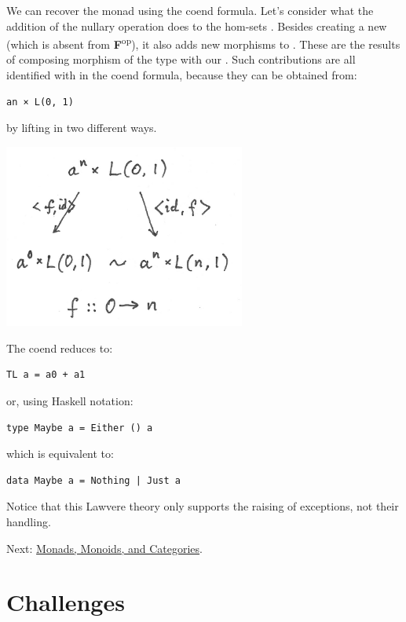 We can recover the  monad using the coend formula. Let's
consider what the addition of the nullary operation does to the hom-sets
. Besides creating a new  (which is
absent from \textbf{F}\textsuperscript{op}), it also adds new morphisms
to . These are the results of composing morphism of the
type  with our .
Such contributions are all identified with  in
the coend formula, because they can be obtained from:

\begin{verbatim}
an × L(0, 1)
\end{verbatim}

by lifting  in two different ways.

\includegraphics[width=3.12500in]{images/equalize2.png}

The coend reduces to:

\begin{verbatim}
TL a = a0 + a1
\end{verbatim}

or, using Haskell notation:

\begin{verbatim}
type Maybe a = Either () a
\end{verbatim}

which is equivalent to:

\begin{verbatim}
data Maybe a = Nothing | Just a
\end{verbatim}

Notice that this Lawvere theory only supports the raising of exceptions,
not their handling.

Next:
\href{https://bartoszmilewski.com/2017/09/06/monads-monoids-and-categories/}{Monads,
Monoids, and Categories}.

\section{Challenges}\label{challenges}

